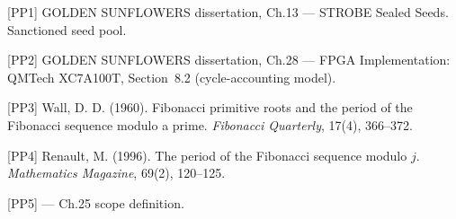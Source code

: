 [PP1] GOLDEN SUNFLOWERS dissertation, Ch.13 --- STROBE Sealed Seeds.
Sanctioned seed pool.

[PP2] GOLDEN SUNFLOWERS dissertation, Ch.28 --- FPGA Implementation:
QMTech XC7A100T, Section~8.2 (cycle-accounting model).

[PP3] Wall, D. D. (1960). Fibonacci primitive roots and the period of
the Fibonacci sequence modulo a prime. \emph{Fibonacci Quarterly},
17(4), 366--372.

[PP4] Renault, M. (1996). The period of the Fibonacci sequence modulo
$j$. \emph{Mathematics Magazine}, 69(2), 120--125.

[PP5]  --- Ch.25 scope definition.

